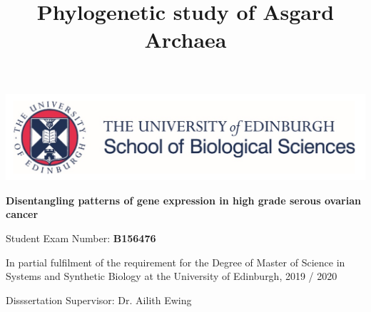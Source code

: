 \documentclass[tikz, 12pt,a4paper,oneside,fleqn]{article}
\title{Phylogenetic study of Asgard Archaea}
\author{}
\begin{document}
\begin{center}
\includegraphics[scale=0.3]{images/UoE_SBO_logo.png}
\end{center}

\vspace{0.3in}

\begin{mdframed}
\begin{center}
\huge
\vspace{0.3in}
\bf
Disentangling patterns of gene expression in high grade serous ovarian cancer
\vspace{0.2in}
\end{center}
\vspace{0.2in}
\end{mdframed}

\vspace{0.3in}

\begin{mdframed}
\begin{center}
\large
\vspace{0.2in}
Student Exam Number: \bf{B156476}
\vspace{0.2in}
\end{center}
\end{mdframed}

\vspace{0.3in}

\begin{mdframed}
\begin{center}
\large
\vspace{0.2in}
In partial fulfilment of the requirement for the Degree of
Master of Science in Systems and Synthetic Biology at the
University of Edinburgh,
2019 / 2020
\vspace{0.2in}
\end{center}
\end{mdframed}

\vspace{0.3in}

\begin{mdframed}
\begin{center}
\large
\vspace{0.2in}

Disssertation Supervisor:  Dr. Ailith Ewing
\vspace{0.2in}
\end{center}
\end{mdframed}
\end{document}
